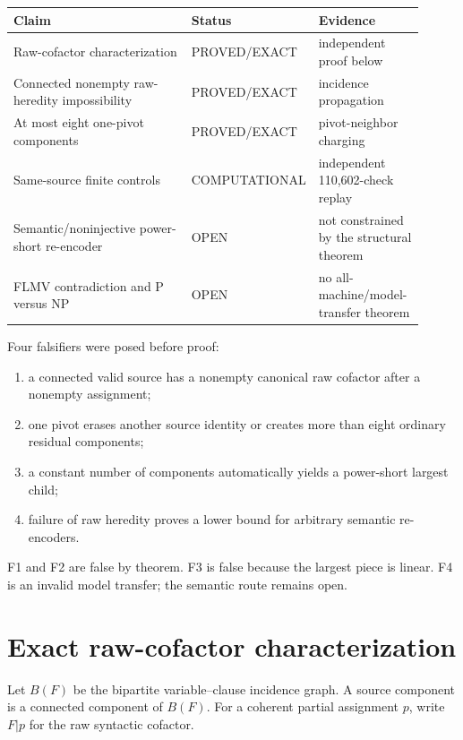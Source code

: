\documentclass[11pt]{article}
\newcommand{\status}[1]{\textsf{#1}}
\begin{document}
\begin{center}
\begin{tabular}{p{0.46\linewidth}p{0.19\linewidth}p{0.26\linewidth}}
\toprule
Claim & Status & Evidence\\
\midrule
Raw-cofactor characterization & \status{PROVED/EXACT} & independent proof below\\
Connected nonempty raw-heredity impossibility & \status{PROVED/EXACT} & incidence propagation\\
At most eight one-pivot components & \status{PROVED/EXACT} & pivot-neighbor charging\\
Same-source finite controls & \status{COMPUTATIONAL} & independent 110,602-check replay\\
Semantic/noninjective power-short re-encoder & \status{OPEN} & not constrained by the structural theorem\\
FLMV contradiction and P versus NP & \status{OPEN} & no all-machine/model-transfer theorem\\
\bottomrule
\end{tabular}
\end{center}

Four falsifiers were posed before proof:
\begin{enumerate}[label=F\arabic*.]
\item a connected valid source has a nonempty canonical raw cofactor after a nonempty assignment;
\item one pivot erases another source identity or creates more than eight ordinary residual components;
\item a constant number of components automatically yields a power-short largest child;
\item failure of raw heredity proves a lower bound for arbitrary semantic re-encoders.
\end{enumerate}
F1 and F2 are false by theorem.  F3 is false because the largest piece is linear.  F4 is an invalid model transfer; the semantic route remains open.

\section{Exact raw-cofactor characterization}
Let $B(F)$ be the bipartite variable--clause incidence graph.  A source component is a connected component of $B(F)$.  For a coherent partial assignment $p$, write $F|p$ for the raw syntactic cofactor.
\end{document}
